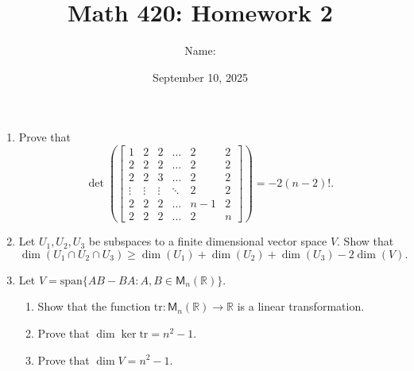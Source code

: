 \documentclass[12pt]{article}
\title{\vspace{-2.5cm}Math 420: Homework 2}
\author{Name:}
\date{September 10, 2025}
\begin{document}
\maketitle

\begin{enumerate}
    \item Prove that 
    \[
    \det \left( \begin{bmatrix}
        1 & 2 & 2 & \dots & 2 & 2 \\
        2 & 2 & 2 & \dots & 2 & 2 \\
        2 & 2 & 3 & \dots & 2 & 2 \\
        \vdots & \vdots & \vdots & \ddots & 2 & 2 \\
        2 & 2 & 2 & \dots & n-1 & 2 \\
        2 & 2 & 2 & \dots & 2 & n
    \end{bmatrix} \right) = -2(n-2)!.
    \]

    \newpage
    \item Let $U_1, U_2, U_3$ be subspaces to a finite dimensional vector space $V$. Show that 
    \[
    \dim ( U_1 \cap U_2 \cap U_3) \geq \dim (U_1) + \dim(U_2) + \dim(U_3) - 2\dim(V).
    \]

    \newpage
    \item Let $V = \text{span}\{AB-BA : A, B \in \mathsf{M}_n(\mathbb{R})\}$.
    \begin{enumerate}
        \item Show that the function $\text{tr}:\mathsf{M}_n(\mathbb{R}) \rightarrow \mathbb{R}$ is a linear transformation.

        \item Prove that $\dim \ker \text{tr} = n^2  -1$.

        \item Prove that $\dim V = n^2 -1$.
    \end{enumerate}
\end{enumerate}
\end{document}
